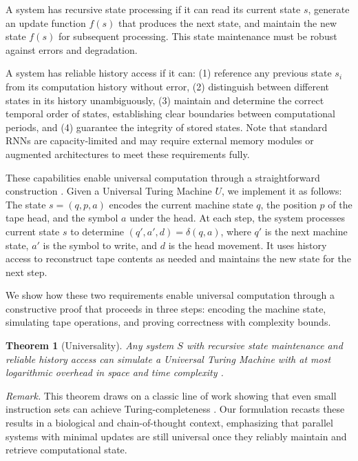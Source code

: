 \documentclass[12pt]{article}
\newtheorem{theorem}{Theorem}
\begin{document}
A system has recursive state processing if it can read its current state $s$, generate an update function $f(s)$ that produces the next state, and maintain the new state $f(s)$ for subsequent processing.
This state maintenance must be robust against errors and degradation.

A system has reliable history access if it can: (1) reference any previous state $s_i$ from its computation history without error, (2) distinguish between different states in its history unambiguously, (3) maintain and determine the correct temporal order of states, establishing clear boundaries between computational periods, and (4) guarantee the integrity of stored states. Note that standard RNNs are capacity-limited and may require external memory modules or augmented architectures to meet these requirements fully.

These capabilities enable universal computation through a straightforward construction \cite{sipser1996introduction,deutsch1995universality,bennett1989time}.
Given a Universal Turing Machine $U$, we implement it as follows: The state $s = (q, p, a)$ encodes the current machine state $q$, the position $p$ of the tape head, and the symbol $a$ under the head.
At each step, the system processes current state $s$ to determine $(q', a', d) = \delta(q, a)$, where $q'$ is the next machine state, $a'$ is the symbol to write, and $d$ is the head movement.
It uses history access to reconstruct tape contents as needed and maintains the new state for the next step.

We show how these two requirements enable universal computation through a constructive proof that proceeds in three steps: encoding the machine state, simulating tape operations, and proving correctness with complexity bounds.

\vspace{1em}

\begin{theorem}[Universality]
Any system $S$ with recursive state maintenance and reliable history access can simulate a Universal Turing Machine with at most logarithmic overhead in space and time complexity \cite{boyle2024memory,liskiewicz1994complexity}.
\end{theorem}

\textit{Remark.}
This theorem draws on a classic line of work showing that even small instruction sets can achieve Turing-completeness \cite{savage1994space,deutsch1995universality,bennett1989time,dolan2013mov}.
Our formulation recasts these results in a biological and chain-of-thought context, emphasizing that parallel systems with minimal updates are still universal once they reliably maintain and retrieve computational state.
\end{document}
